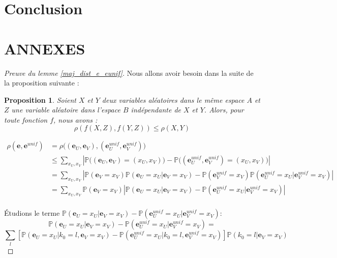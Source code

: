 \documentclass[12pt]{article}
\theoremstyle{plain}
\newtheorem{propo}[thm]{Proposition}
\newcommand{\e}{\mathbf{e}}
\begin{document}
\section*{Conclusion}

\newpage



\section*{ANNEXES}
\begin{proof}[Preuve du lemme \ref{maj_dist_e_eunif}]
Nous allons avoir besoin dans la suite de la proposition suivante :
\begin{propo}\label{rho_f}
Soient $X$ et $Y$ deux variables aléatoires dans le même espace $A$ et $Z$ une variable aléatoire dans l'espace $B$ indépendante de $X$ et $Y$. Alors, pour toute fonction $f$, nous avons : $$ \rho(f(X,Z),f(Y,Z)) \leq \rho(X,Y)$$
\end{propo}

{\scriptsize
\begin{equation*}
\begin{split}
\rho(\e,\e^{unif}) &= \rho\Big((\e_U,\e_V),(\e_U^{unif},\e_V^{unif})\Big)\\
&\leq \sum\limits_{x_U,x_V} \left|\mathbb{P}\Big((\e_U,\e_V)=(x_U,x_V)\Big) - \mathbb{P}\Big((\e_U^{unif},\e_V^{unif})=(x_U,x_V)\Big)\right|\\
&= \sum\limits_{x_U,x_V} \left|\mathbb{P}(\e_V = x_V)\mathbb{P}(\e_U=x_U|\e_V=x_V) - \mathbb{P}(\e_V^{unif} = x_V)\mathbb{P}(\e_U^{unif}=x_U | \e_V^{unif}=x_V)\right|\\
&= \sum\limits_{x_U,x_V} \mathbb{P}(\e_V = x_V)\left|\mathbb{P}(\e_U=x_U|\e_V=x_V) - \mathbb{P}(\e_U^{unif}=x_U | \e_V^{unif}=x_V)\right|\\
\end{split}
\end{equation*}}

Étudions le terme  $\mathbb{P}(\e_U=x_U|\e_V=x_V) - \mathbb{P}(\e_U^{unif}=x_U | \e_V^{unif}=x_V)$:
{\scriptsize
$$ \mathbb{P}(\e_U=x_U|\e_V=x_V) - \mathbb{P}(\e_U^{unif}=x_U | \e_V^{unif}=x_V) =  $$
$$ \sum\limits_l \left[ \mathbb{P}(\e_U=x_U|k_0 = l,\e_V=x_V) - \mathbb{P}(\e_U^{unif}=x_U |k_0 = l, \e_V^{unif}=x_V) \right] \mathbb{P}\left(k_0 = l | \e_V =x_V\right)$$
}


\end{proof}
\end{document}
